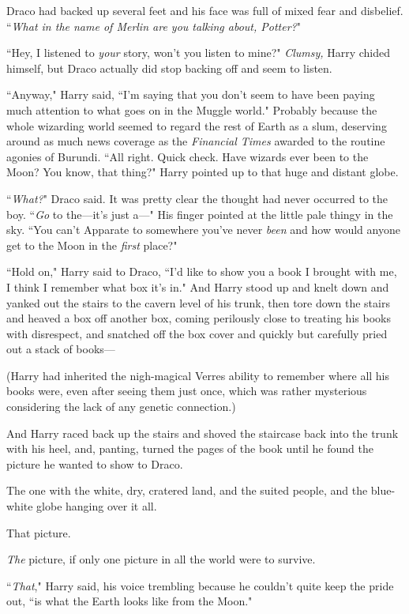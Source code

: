 Draco had backed up several feet and his face was full of mixed fear and disbelief. ``\emph{What in the name of Merlin are you talking about, Potter?}"

``Hey, I listened to \emph{your} story, won't you listen to mine?" \emph{Clumsy,} Harry chided himself, but Draco actually did stop backing off and seem to listen.

``Anyway," Harry said, ``I'm saying that you don't seem to have been paying much attention to what goes on in the Muggle world." Probably because the whole wizarding world seemed to regard the rest of Earth as a slum, deserving around as much news coverage as the \emph{Financial Times} awarded to the routine agonies of Burundi. ``All right. Quick check. Have wizards ever been to the Moon? You know, that thing?" Harry pointed up to that huge and distant globe.

``\emph{What?}" Draco said. It was pretty clear the thought had never occurred to the boy. ``\emph{Go} to the—it's just a—" His finger pointed at the little pale thingy in the sky. ``You can't Apparate to somewhere you've never \emph{been} and how would anyone get to the Moon in the \emph{first} place?"

``Hold on," Harry said to Draco, ``I'd like to show you a book I brought with me, I think I remember what box it's in." And Harry stood up and knelt down and yanked out the stairs to the cavern level of his trunk, then tore down the stairs and heaved a box off another box, coming perilously close to treating his books with disrespect, and snatched off the box cover and quickly but carefully pried out a stack of books—

(Harry had inherited the nigh-magical Verres ability to remember where all his books were, even after seeing them just once, which was rather mysterious considering the lack of any genetic connection.)

And Harry raced back up the stairs and shoved the staircase back into the trunk with his heel, and, panting, turned the pages of the book until he found the picture he wanted to show to Draco.

The one with the white, dry, cratered land, and the suited people, and the blue-white globe hanging over it all.

That picture.

\emph{The} picture, if only one picture in all the world were to survive.

``\emph{That}," Harry said, his voice trembling because he couldn't quite keep the pride out, ``is what the Earth looks like from the Moon."

